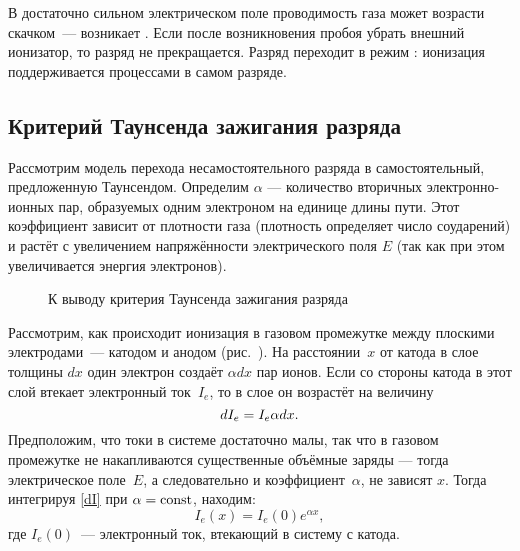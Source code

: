 В достаточно сильном электрическом поле проводимость газа может возрасти
скачком~--- возникает .
Если после возникновения пробоя убрать внешний ионизатор, то разряд не
прекращается. Разряд переходит в режим :
ионизация поддерживается процессами в самом разряде.

\subsection*{Критерий Таунсенда зажигания разряда}
Рассмотрим модель перехода несамостоятельного разряда в самостоятельный,
предложенную Таунсендом.
Определим  $\alpha$ ---
количество вторичных электронно-ионных пар, образуемых одним электроном
на единице длины пути.
Этот коэффициент зависит от плотности газа
(плотность определяет число соударений)
и растёт с увеличением напряжённости электрического поля $E$
(так как при этом увеличивается энергия электронов).

\begin{figure}[h!]
    \centering
    \caption{К выводу критерия Таунсенда зажигания разряда}
\end{figure}

Рассмотрим, как происходит ионизация в газовом промежутке между плоскими
электродами~--- катодом и анодом (рис.~). На
расстоянии~$x$ от катода в слое толщины $dx$ один электрон создаёт $\alpha dx$
пар ионов. Если со стороны катода в этот
слой втекает электронный ток~$I_e$, то в слое он возрастёт на величину
\begin{equation*}
\eqmark{dI}
dI_e=I_e\alpha dx.
\end{equation*}
Предположим, что токи в системе достаточно малы, так что в газовом промежутке
не накапливаются существенные объёмные заряды --- тогда электрическое поле~$E$,
а следовательно и коэффициент~$\alpha$, не зависят $x$.
Тогда интегрируя \eqref{dI} при $\alpha=\mathrm{const}$, находим:
\begin{equation*}
	I_e(x)=I_e(0)e^{\alpha x},
\end{equation*}
где $I_e(0)$~--- электронный ток, втекающий в систему с катода.

